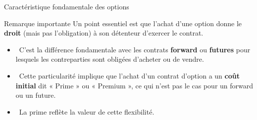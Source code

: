 \documentclass[aspectratio=169, 10pt]{beamer}
\begin{document}
\begin{frame}{Caractéristique fondamentale des options}
    \begin{block}{Remarque importante}
    Un point essentiel est que l'achat d'une option donne le \textbf{droit} (mais pas l'obligation) à son détenteur d'exercer le contrat. 
    \end{block}
    
    \vspace{0.3cm}
    \begin{itemize}
        \item {} \ C'est la différence fondamentale avec les contrats \textbf{forward} ou \textbf{futures} pour lesquels les contreparties sont obligées d'acheter ou de vendre.
        \item {} \ Cette particularité implique que l'achat d'un contrat d'option a un \textbf{coût initial} dit « Prime » ou « Premium », ce qui n'est pas le cas pour un forward ou un future.
        \item {} \ La prime reflète la valeur de cette flexibilité.
    \end{itemize}
\end{frame}
\end{document}
